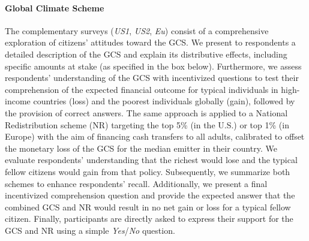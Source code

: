 \documentclass{nature}
\begin{document}

\paragraph{Global Climate Scheme}\label{subsubsec:support_gcs} %

The complementary surveys (\textit{US1}, \textit{US2}, \textit{Eu}) consist of a comprehensive exploration of citizens' attitudes toward the GCS. We present to respondents a detailed description of the GCS and explain its distributive effects, including specific amounts at stake (as specified in the box below). 
Furthermore, we assess respondents' understanding of the GCS with incentivized questions to test their comprehension of the expected financial outcome for typical individuals in high-income countries (loss) and the poorest individuals globally (gain), followed by the provision of correct answers. The same approach is applied to a National Redistribution scheme (NR) targeting the top 5\% (in the U.S.) or top 1\% (in Europe) with the aim of financing cash transfers to all adults, %
calibrated to offset the monetary loss of the GCS for the median emitter in their country. We evaluate respondents' understanding that the richest would lose and the typical fellow citizens would gain from that policy. %
Subsequently, we summarize both schemes to enhance respondents' recall. Additionally, we present a final incentivized comprehension question and provide the expected answer that the combined GCS and NR would result in no net gain or loss for a typical fellow citizen. Finally, participants are directly asked to express their support for the GCS and NR using a simple \textit{Yes}/\textit{No} question. %
\end{document}
